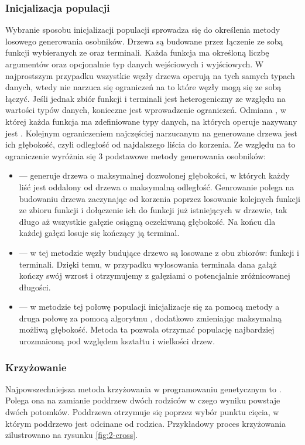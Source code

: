 \subsubsection{Inicjalizacja populacji}
\label{ssec:inicjalizacja}
Wybranie sposobu inicjalizacji populacji sprowadza się do określenia metody losowego generowania osobników. Drzewa są budowane przez łączenie ze sobą funkcji wybieranych ze  oraz terminali. Każda funkcja ma określoną liczbę argumentów oraz opcjonalnie typ danych wejściowych i wyjściowych. W najprostszym przypadku wszystkie węzły drzewa operują na tych samych typach danych, wtedy nie narzuca się ograniczeń na to które węzły mogą się ze sobą łączyć. Jeśli jednak zbiór funkcji i terminali jest heterogeniczny ze względu na wartości typów danych, konieczne jest wprowadzenie ograniczeń. Odmiana , w której każda funkcja ma zdefiniowane typy danych, na których operuje nazywany jest .
Kolejnym ograniczeniem najczęściej narzucanym na generowane drzewa jest ich głębokość, czyli odległość od najdalszego liścia do korzenia. Ze względu na to ograniczenie wyróżnia się 3 podstawowe metody generowania osobników:
\begin{itemize}
	\item {} --- generuje drzewa o maksymalnej dozwolonej głębokości, w których każdy liść jest oddalony od drzewa o maksymalną odległość. Genrowanie polega na budowaniu drzewa zaczynając od korzenia poprzez losowanie kolejnych funkcji ze zbioru funkcji i dołączenie ich do funkcji już istniejących w drzewie, tak długo aż wszystkie gałęzie osiągną oczekiwaną głębokość. Na końcu dla każdej gałęzi losuje się kończący ją terminal.
	\item {} --- w tej metodzie węzły budujące drzewo są losowane z obu zbiorów: funkcji i terminali. Dzięki temu, w przypadku wylosowania terminala dana gałąż kończy swój wzrost i otrzymujemy z gałęziami o potencjalnie zróżnicowanej długości.
	\item {} --- w metodzie tej połowę populacji inicjalizacje się za pomocą metody  a druga połowę za pomocą algorytmu , dodatkowo zmieniając maksymalną możliwą głębokość. Metoda ta pozwala otrzymać populację najbardziej urozmaiconą pod względem kształtu i wielkości drzew.
\end{itemize}


\subsubsection{Krzyżowanie}
Najpowszechniejsza metoda krzyżowania w programowaniu genetycznym to . Polega ona na zamianie poddrzew dwóch rodziców w czego wyniku powstaje dwóch potomków. Poddrzewa otrzymuje się poprzez wybór punktu cięcia, w którym poddrzewo jest odcinane od rodzica. Przykładowy proces krzyżowania zilustrowano na rysunku \ref{fig:2-cross}.

